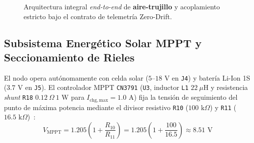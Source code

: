 \documentclass[conference]{IEEEtran}
\begin{document}
\begin{figure}[!t]
\caption{Arquitectura integral \emph{end-to-end} de \textbf{aire-trujillo} y acoplamiento estricto bajo el contrato de telemetría Zero-Drift.}
\label{fig:sys_arch}
\end{figure}

\subsection{Subsistema Energético Solar MPPT y Seccionamiento de Rieles}

El nodo opera autónomamente con celda solar ($5\text{--}18\text{ V}$ en \texttt{J4}) y batería Li-Ion 1S ($3.7\text{ V}$ en \texttt{J5}). El controlador MPPT \texttt{CN3791} (\texttt{U3}, inductor \texttt{L1} $22\ \mu\text{H}$ y resistencia \emph{shunt} \texttt{R18} $0.12\ \Omega\ 1\text{ W}$ para $I_{\mathrm{chg,max}} = 1.0\text{ A}$) fija la tensión de seguimiento del punto de máxima potencia mediante el divisor resistivo \texttt{R10} ($100\text{ k}\Omega$) y \texttt{R11} ($16.5\text{ k}\Omega$)~\cite{consonance2018cn3791}:
\begin{equation}
V_{\mathrm{MPPT}} = 1.205\left(1 + \frac{R_{10}}{R_{11}}\right) = 1.205\left(1 + \frac{100}{16.5}\right) \approx 8.51\text{ V}
\label{eq:mppt}
\end{equation}
\end{document}
